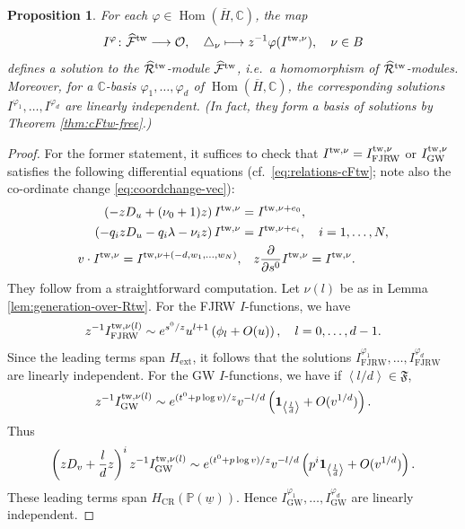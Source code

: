 \documentclass[11pt]{amsart}
\newtheorem{pro}[thm]{Proposition} %
\theoremstyle{definition} %
\theoremstyle{remark} %
\newcommand{\CC}{\mathbb C}
\newcommand{\PP}{\mathbb P}
\newcommand{\Hom}{\operatorname{Hom}}
\newcommand{\tw}{{\rm tw}}
\def\GW{\operatorname{\text{GW}}}
\def\CR{\operatorname{\text{CR}}}
\def\parfrac#1#2{\frac{\partial #1}{\partial #2}}
\def\fracp#1{\left\langle #1 \right\rangle}
\newcommand{\cO}{\mathcal{O}}
\newcommand{\cF}{\mathcal{F}}
\newcommand{\hcF}{\widehat{\cF}}
\newcommand{\cR}{\mathcal{R}}
\newcommand{\hcR}{\widehat{\cR}}
\newcommand{\frF}{\mathfrak{F}}
\newcommand{\unit}{\boldsymbol{1}}
\newcommand{\ext}{{\operatorname{ext}}}
\newcommand{\FJRW}{{\operatorname{FJRW}}}
\renewcommand{\GW}{{\operatorname{GW}}}
\renewcommand{\CR}{{\operatorname{CR}}}
\newcommand{\ov}{\overline}
\newcommand{\uw}{\underline{w}}
\begin{document}
\begin{pro} 
\label{pro:basisofsol-cFtw} 
For each $\varphi \in \Hom(\ov{H},\CC)$, 
the map 
\[
I^\varphi \colon \hcF^\tw 
\longrightarrow \cO, \quad 
\triangle_\nu \longmapsto z^{-1} \varphi(I^{\tw,\nu}), \quad 
\nu \in B 
\]
defines a solution to the $\hcR^\tw$-module 
$\hcF^\tw$, i.e.\ a homomorphism of 
$\hcR^\tw$-modules. 
Moreover, for a $\CC$-basis $\varphi_1,\dots,\varphi_d$ of 
$\Hom(\ov{H},\CC)$, the corresponding solutions 
$I^{\varphi_1},\dots,I^{\varphi_{d}}$ are linearly independent. 
(In fact, they form a basis of solutions by 
Theorem \ref{thm:cFtw-free}.)
\end{pro} 
\begin{proof} 
For the former statement, it suffices to check that $I^{\tw,\nu} 
= I^{\tw,\nu}_{\FJRW}$ or $I^{\tw,\nu}_{\GW}$ satisfies 
the following differential equations 
(cf.\ \eqref{eq:relations-cFtw}; note also the co-ordinate 
change \eqref{eq:coordchange-vec}): 
\begin{align}
\label{eq:diffeq-generalized-I} 
\begin{split} 
\left(-z D_u + (\nu_0+1) z\right) 
I^{\tw,\nu} & = I^{\tw, \nu + e_0}, \\ 
\left(-q_i z D_u - q_i \lambda -\nu_i z \right)
I^{\tw,\nu} 
& = I^{\tw,\nu+ e_i}, \quad i=1,\dots, N, \\ 
v \cdot I^{\tw,\nu} = I^{\tw,\nu + (-d,w_1,\dots,w_N)},  
&\quad  
z \parfrac{}{s^0} I^{\tw,\nu} = I^{\tw,\nu}. 
\end{split} 
\end{align} 
They follow from a straightforward computation. 
Let $\nu(l)$ be as in Lemma \ref{lem:generation-over-Rtw}. 
For the FJRW $I$-functions, we have 
\begin{equation} 
\label{eq:FJRW-Itw-asympt} 
z^{-1} I^{\tw,\nu(l)}_{\FJRW} \sim 
e^{s^0/z} 
u^{l+1} \left( \phi_l + O(u)\right), \quad 
l=0,\dots, d-1. 
\end{equation} 
Since the leading terms span $H_{\ext}$, 
it follows that the solutions 
$I^{\varphi_{1}}_{\FJRW},\dots,I^{\varphi_{d}}_{\FJRW}$ 
are linearly independent. 
For the GW $I$-functions, we have 
if $\fracp{l/d} \in \frF$, 
\[
z^{-1} I^{\tw, \nu(l)}_{\GW} \sim 
e^{(t^0 + p \log v)/z} 
v^{-l/d} \left ( \unit_{\fracp{\frac{l}{d}}}  
+ O(v^{1/d}) \right).     
\]
Thus 
\begin{equation}
\label{eq:GW-Itw-asympt} 
\left(z D_v + \frac{l}{d}z\right)^i z^{-1} I^{\tw,\nu(l)}_{\GW} 
\sim e^{(t^0 + p \log v)/z} 
v^{-l/d} \left (p^i \unit_{\fracp{\frac{l}{d}}}  
+ O(v^{1/d}) \right). 
\end{equation} 
These leading terms span $H_{\CR}(\PP(\uw))$. 
Hence $I^{\varphi_{1}}_{\GW},\dots,I^{\varphi_{d}}_{\GW}$ are 
linearly independent. 
\end{proof} 
\end{document}
